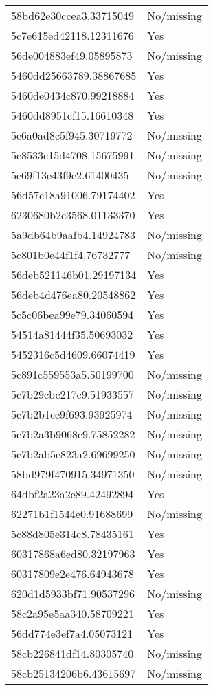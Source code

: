 \begin{tabular}{ll}
58bd62e30ccea3.33715049 & No/missing \\
5c7e615ed42118.12311676 & Yes \\
56de004883ef49.05895873 & No/missing \\
5460dd25663789.38867685 & Yes \\
5460de0434c870.99218884 & Yes \\
5460dd8951cf15.16610348 & Yes \\
5e6a0ad8c5f945.30719772 & No/missing \\
5c8533c15d4708.15675991 & No/missing \\
5e69f13e43f9e2.61400435 & No/missing \\
56d57c18a91006.79174402 & Yes \\
6230680b2c3568.01133370 & Yes \\
5a9db64b9aafb4.14924783 & No/missing \\
5c801b0e44f1f4.76732777 & No/missing \\
56deb521146b01.29197134 & Yes \\
56deb4d476ea80.20548862 & Yes \\
5c5c06bea99e79.34060594 & Yes \\
54514a81444f35.50693032 & Yes \\
5452316c5d4609.66074419 & Yes \\
5c891c559553a5.50199700 & No/missing \\
5c7b29cbc217c9.51933557 & No/missing \\
5c7b2b1ce9f693.93925974 & No/missing \\
5c7b2a3b9068c9.75852282 & No/missing \\
5c7b2ab5e823a2.69699250 & No/missing \\
58bd979f470915.34971350 & No/missing \\
64dbf2a23a2e89.42492894 & Yes \\
62271b1f1544e0.91688699 & No/missing \\
5c88d805e314c8.78435161 & Yes \\
60317868a6ed80.32197963 & Yes \\
60317809e2e476.64943678 & Yes \\
620d1d5933bf71.90537296 & No/missing \\
58c2a95e5aa340.58709221 & Yes \\
56dd774e3ef7a4.05073121 & Yes \\
58cb226841df14.80305740 & No/missing \\
58cb25134206b6.43615697 & No/missing \\

\end{tabular}
